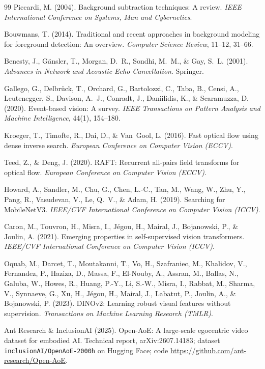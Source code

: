 \documentclass[UTF8,12pt,a4paper]{ctexart}
\begin{document}
\begin{thebibliography}{99}
Piccardi, M. (2004).
Background subtraction techniques: A review.
\emph{IEEE International Conference on Systems, Man and Cybernetics}.

Bouwmans, T. (2014).
Traditional and recent approaches in background modeling for foreground detection: An overview.
\emph{Computer Science Review}, 11--12, 31--66.

Benesty, J., G{\"a}nsler, T., Morgan, D.~R., Sondhi, M.~M., \& Gay, S.~L. (2001).
\emph{Advances in Network and Acoustic Echo Cancellation}.
Springer.

Gallego, G., Delbr{\"u}ck, T., Orchard, G., Bartolozzi, C., Taba, B., Censi, A., Leutenegger, S., Davison, A.~J., Conradt, J., Daniilidis, K., \& Scaramuzza, D. (2020).
Event-based vision: A survey.
\emph{IEEE Transactions on Pattern Analysis and Machine Intelligence}, 44(1), 154--180.

Kroeger, T., Timofte, R., Dai, D., \& Van~Gool, L. (2016).
Fast optical flow using dense inverse search.
\emph{European Conference on Computer Vision (ECCV)}.

Teed, Z., \& Deng, J. (2020).
RAFT: Recurrent all-pairs field transforms for optical flow.
\emph{European Conference on Computer Vision (ECCV)}.

Howard, A., Sandler, M., Chu, G., Chen, L.-C., Tan, M., Wang, W., Zhu, Y., Pang, R., Vasudevan, V., Le, Q.~V., \& Adam, H. (2019).
Searching for MobileNetV3.
\emph{IEEE/CVF International Conference on Computer Vision (ICCV)}.

Caron, M., Touvron, H., Misra, I., J{\'e}gou, H., Mairal, J., Bojanowski, P., \& Joulin, A. (2021).
Emerging properties in self-supervised vision transformers.
\emph{IEEE/CVF International Conference on Computer Vision (ICCV)}.

Oquab, M., Darcet, T., Moutakanni, T., Vo, H., Szafraniec, M., Khalidov, V., Fernandez, P., Haziza, D., Massa, F., El-Nouby, A., Assran, M., Ballas, N., Galuba, W., Howes, R., Huang, P.-Y., Li, S.-W., Misra, I., Rabbat, M., Sharma, V., Synnaeve, G., Xu, H., J{\'e}gou, H., Mairal, J., Labatut, P., Joulin, A., \& Bojanowski, P. (2023).
DINOv2: Learning robust visual features without supervision.
\emph{Transactions on Machine Learning Research (TMLR)}.

Ant Research \& InclusionAI (2025).
Open-AoE: A large-scale egocentric video dataset for embodied AI.
Technical report, arXiv:2607.14183;
dataset \texttt{inclusionAI/OpenAoE-2000h} on Hugging Face;
code \url{https://github.com/ant-research/Open-AoE}.

\end{thebibliography}
\end{document}
